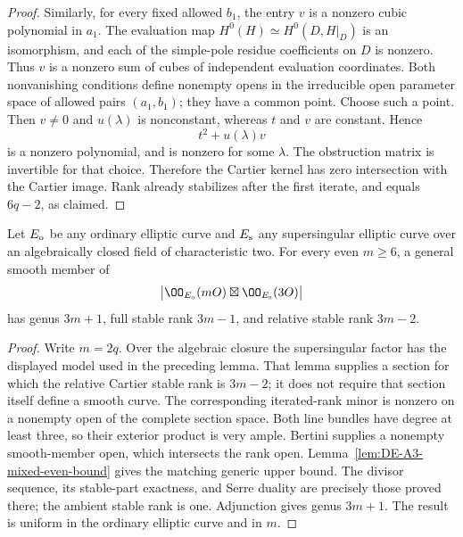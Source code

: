 \begin{proof}
Similarly, for every fixed allowed $b_1$, the entry $v$ is a
nonzero cubic polynomial in $a_1$.  The evaluation map
$H^0(H)\simeq H^0(D,H|_D)$ is an isomorphism, and each of the
simple-pole residue coefficients on $D$ is nonzero.
Thus $v$ is a nonzero sum of cubes of independent evaluation
coordinates.  Both nonvanishing conditions define nonempty opens
in the irreducible open parameter space of allowed pairs $(a_1,b_1)$;
they have a common point.
Choose such a point.  Then $v\ne0$ and $u(\lambda)$ is nonconstant,
whereas $t$ and $v$ are constant.  Hence
\[
                  t^2+u(\lambda)v
\]
is a nonzero polynomial, and is nonzero for some $\lambda$.
The obstruction matrix is invertible for that choice.
Therefore the Cartier kernel has zero intersection with the Cartier
image.  Rank already stabilizes after the first iterate, and equals
$6q-2$, as claimed.
\end{proof}

\begin{theorem}
\label{thm:DE-A3-mixed-thin-all}
Let $E_{\rm o}$ be any ordinary elliptic curve and $E_{\rm s}$
any supersingular elliptic curve over an algebraically closed
field of characteristic two.  For every even $m\ge6$, a general
smooth member of
\[
 \bigl|\OO_{E_{\rm o}}(mO)\boxtimes\OO_{E_{\rm s}}(3O)\bigr|
\]
has genus $3m+1$, full stable rank $3m-1$, and relative stable
rank $3m-2$.
\end{theorem}
\begin{proof}
Write $m=2q$.  Over the algebraic closure the supersingular factor
has the displayed model used in the preceding lemma.
That lemma supplies a section for which the relative Cartier
stable rank is $3m-2$; it does not require that section itself
define a smooth curve.
The corresponding iterated-rank minor is nonzero on a nonempty
open of the complete section space.  Both line bundles have
degree at least three, so their exterior product is very ample.
Bertini supplies a nonempty smooth-member open, which intersects
the rank open.
Lemma~\ref{lem:DE-A3-mixed-even-bound} gives the matching generic
upper bound.  The divisor sequence, its stable-part exactness,
and Serre duality are precisely those proved there; the ambient
stable rank is one.  Adjunction gives genus $3m+1$.
The result is uniform in the ordinary elliptic curve and in $m$.
\end{proof}


